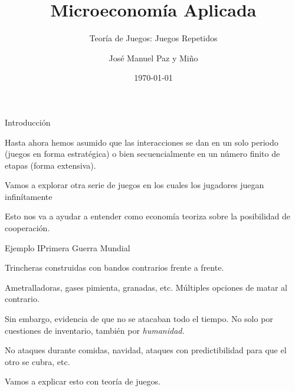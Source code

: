 \documentclass[notes, 11pt]{beamer} %
\newenvironment{wideitemize}{\itemize\addtolength{\itemsep}{10pt}}{\enditemize}
\begin{document}
\title{Microeconom\'ia Aplicada}   
\subtitle{Teor\'ia de Juegos: Juegos Repetidos}   
\author[Paz y Mino ]{Jos\'e Manuel Paz y Mi\~no}
\date{\today} 

\frame{\titlepage} 

\begin{frame}{Introducci\'on}
	\begin{wideitemize}
		\item<1-> Hasta ahora hemos asumido que las interacciones se dan en un solo periodo (juegos en forma estrat\'egica) o bien secuencialmente en un n\'umero finito de etapas (forma extensiva).
		\item<2-> Vamos a explorar otra serie de juegos en los cuales los jugadores juegan infin\'itamente
		\item<3-> Esto nos va a ayudar a entender como econom\'ia teoriza sobre la posibilidad de cooperaci\'on.
	\end{wideitemize}
\end{frame}

\begin{frame}{Ejemplo I}{Primera Guerra Mundial}
	\begin{wideitemize}
		\item<1-> Trincheras construidas con bandos contrarios frente a frente.
		\item<2-> Ametralladoras, gases pimienta, granadas, etc. M\'ultiples opciones de matar al contrario.
		\item<3-> Sin embargo, evidencia de que no se atacaban todo el tiempo. No solo por cuestiones de inventario, tambi\'en por \textit{humanidad.}
		\item<4-> No ataques durante comidas, navidad, ataques con predictibilidad para que el otro se cubra, etc.
		\item<5-> Vamos a explicar esto con teor\'ia de juegos.
	\end{wideitemize}
\end{frame}
\end{document}
